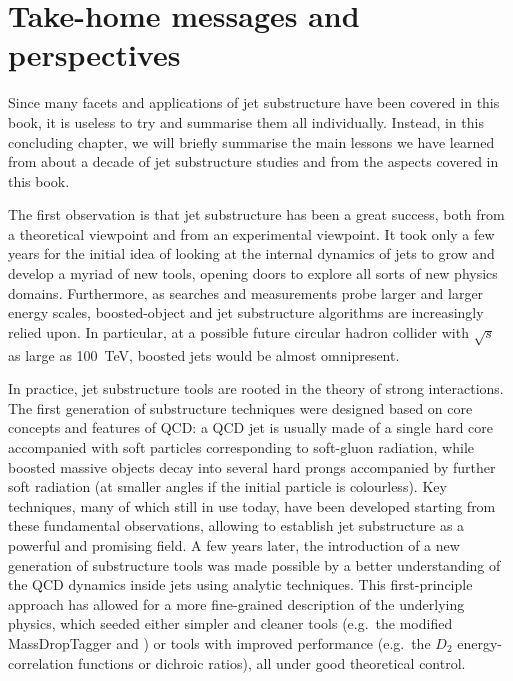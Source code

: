 %
\chapter{Take-home messages and perspectives}\label{summary}

Since many facets and applications of jet substructure have been
covered in this book, it is useless to try and summarise them
all individually.
%
Instead, in this concluding chapter, we will briefly summarise the
main lessons we have learned from about a decade of jet
substructure studies and from the aspects covered in this book.

The first observation is that jet substructure has been a great 
success, both from a theoretical viewpoint and from an
experimental viewpoint. 
%
It took only a few years for the initial idea of
looking at the internal dynamics of jets to grow and develop a myriad
of new tools, opening doors to explore all sorts of new physics
domains.
%
Furthermore, as searches and measurements probe larger and larger
energy scales, boosted-object and jet substructure algorithms are
increasingly relied upon. In particular, at a possible future circular
hadron collider with $\sqrt{s}$ as large as 100~TeV, boosted jets
would be almost omnipresent.

In practice, jet substructure tools are rooted in the theory of strong
interactions. The first generation of substructure techniques were
designed based on core concepts and features of QCD: a QCD jet is
usually made of a single hard core accompanied with soft particles
corresponding to soft-gluon radiation, while boosted massive objects
decay into several hard prongs accompanied by further soft radiation
(at smaller angles if the initial particle is colourless).
%
Key techniques, many of which still in use today, have been developed
starting from these fundamental observations, allowing to establish
jet substructure as a powerful and promising field.
%
A few years later, the introduction of a new generation of
substructure tools was made possible by a better understanding of the
QCD dynamics inside jets using analytic techniques.
%
This first-principle approach has allowed for a more fine-grained
description of the underlying physics, which seeded either simpler
and cleaner tools (e.g.\ the modified MassDropTagger and \SD) or
tools with improved performance (e.g.\ the $D_2$ energy-correlation
functions or dichroic ratios), all under good  theoretical control. 

